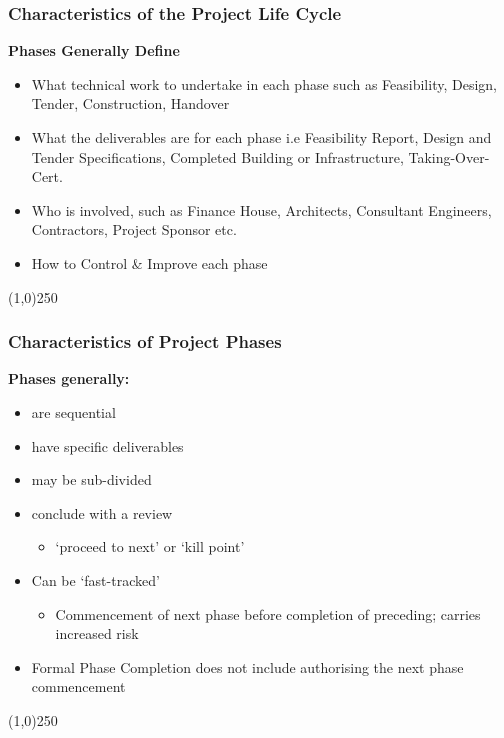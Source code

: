 \begin{frame}
\frametitle{Characteristics of the Project Life Cycle}
\textbf{Phases Generally Define}\\
\begin{itemize}
	\item What technical work to undertake in each phase such as Feasibility, Design, Tender, Construction, Handover
	\item What the deliverables are for each phase i.e Feasibility Report, Design and Tender Specifications, Completed Building or Infrastructure, Taking-Over-Cert.
	\item Who is involved, such as Finance House, Architects, Consultant Engineers, Contractors, Project Sponsor etc.
	\item How to Control \& Improve each phase
\end{itemize}
\end{frame}
\begin{center}\line(1,0){250}\end{center}



\begin{frame}
\frametitle{Characteristics of Project Phases}
\textbf{Phases generally:}
\begin{itemize}
	\item are sequential
	\item have specific deliverables
	\item may be sub-divided
	\item conclude with a review
		\begin{itemize}
			\item `proceed to next' or `kill point'
		\end{itemize}
	\item Can be `fast-tracked'
		\begin{itemize}
			\item Commencement of next phase before completion of preceding; carries increased risk
		\end{itemize}
	\item Formal Phase Completion does not include authorising the next phase commencement
\end{itemize}
\end{frame}
\begin{center}\line(1,0){250}\end{center}



